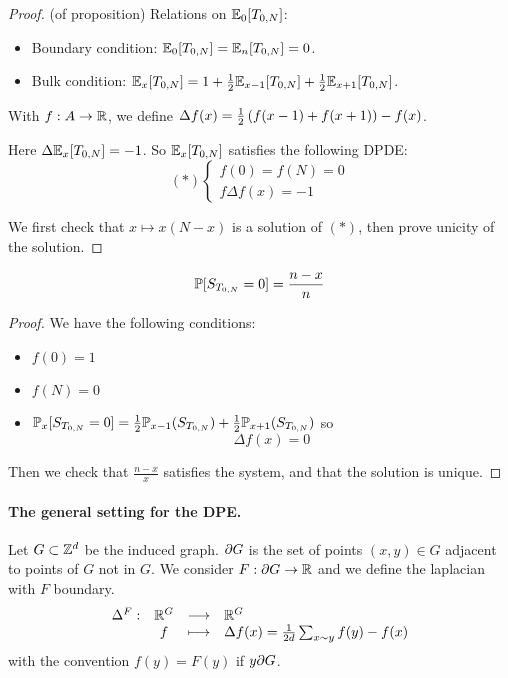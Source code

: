     \begin{proof}
        (of proposition)
        Relations on $\mathbb{E}_0[T_{0, N}]$:
        \begin{itemize}
            \item Boundary condition: $\mathbb{E}_0[T_{0, N}] = \mathbb{E}_n[T_{0, N}] = 0$. 
            \item Bulk condition: $\mathbb{E}_x[T_{0, N}] = 1 + 
                \frac{1}{2} \mathbb{E}_{x-1}[T_{0, N}]
                + \frac{1}{2} \mathbb{E}_{x+1}[T_{0, N}]$.
        \end{itemize}

        With $f: A \to \mathbb R$, we define $\Delta f(x) = \frac{1}{2} \left(
            f(x - 1) + f(x + 1)
        \right) - f(x)$. 
        
        Here $\Delta \mathbb{E}_x[T_{0, N}] = -1$. So 
        $\mathbb{E}_x[T_{0, N}]$ satisfies the following DPDE:
        \[
            (*) \begin{cases}
                f(0) = f(N) = 0 \\
                f\Delta f(x) = -1
            \end{cases}
        \]

        We first check that $x \mapsto x(N - x)$ is a solution of $(*)$,
        then prove unicity of the solution.
    \end{proof}

    \begin{proposition}
        \[
            \mathbb P[S_{T_{0, N}} = 0] = \frac{n - x}{n}
        \]
    \end{proposition}

    \begin{proof}
        We have the following conditions:
        \begin{itemize}
            \item $f(0) = 1$
            \item $f(N) = 0$
            \item $\mathbb P_x[S_{T_{0, N}} = 0] = 
                \frac{1}{2} \mathbb P_{x-1} (S_{T_{0, N}})
                + \frac{1}{2} \mathbb P_{x+1} (S_{T_{0, N}})
            $ so \[
                \Delta f(x) = 0
            \]
        \end{itemize}

        Then we check that $\frac{n-x}{x}$ satisfies the system, and that the
        solution is unique.
    \end{proof}

    \paragraph{The general setting for the DPE.}
    Let $G \subset \mathbb Z^d$ be the induced graph. 
    $\partial G$ is the set of points $(x, y) \in G$ adjacent to
    points of $G$ not in $G$.
    We consider $F: \partial G \to \mathbb R$ and we define the laplacian
    with $F$ boundary.
    \[
        \begin{array}{rccl} \Delta^F : & \mathbb R^G & \longrightarrow & \mathbb R^G \\ & f & \longmapsto & \Delta f(x) 
                = \frac{1}{2d} \sum_{x \sim y} f(y) - f(x) \end{array}
    \]
    with the convention $f(y) = F(y)$ if $y \partial G$.

